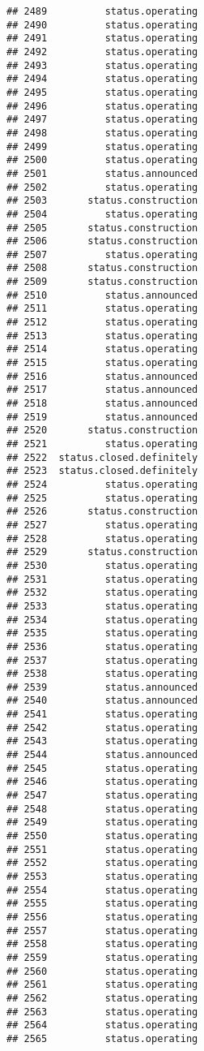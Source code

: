 \documentclass[
]{article}
\begin{document}
\begin{verbatim}
## 2489          status.operating
## 2490          status.operating
## 2491          status.operating
## 2492          status.operating
## 2493          status.operating
## 2494          status.operating
## 2495          status.operating
## 2496          status.operating
## 2497          status.operating
## 2498          status.operating
## 2499          status.operating
## 2500          status.operating
## 2501          status.announced
## 2502          status.operating
## 2503       status.construction
## 2504          status.operating
## 2505       status.construction
## 2506       status.construction
## 2507          status.operating
## 2508       status.construction
## 2509       status.construction
## 2510          status.announced
## 2511          status.operating
## 2512          status.operating
## 2513          status.operating
## 2514          status.operating
## 2515          status.operating
## 2516          status.announced
## 2517          status.announced
## 2518          status.announced
## 2519          status.announced
## 2520       status.construction
## 2521          status.operating
## 2522  status.closed.definitely
## 2523  status.closed.definitely
## 2524          status.operating
## 2525          status.operating
## 2526       status.construction
## 2527          status.operating
## 2528          status.operating
## 2529       status.construction
## 2530          status.operating
## 2531          status.operating
## 2532          status.operating
## 2533          status.operating
## 2534          status.operating
## 2535          status.operating
## 2536          status.operating
## 2537          status.operating
## 2538          status.operating
## 2539          status.announced
## 2540          status.announced
## 2541          status.operating
## 2542          status.operating
## 2543          status.operating
## 2544          status.announced
## 2545          status.operating
## 2546          status.operating
## 2547          status.operating
## 2548          status.operating
## 2549          status.operating
## 2550          status.operating
## 2551          status.operating
## 2552          status.operating
## 2553          status.operating
## 2554          status.operating
## 2555          status.operating
## 2556          status.operating
## 2557          status.operating
## 2558          status.operating
## 2559          status.operating
## 2560          status.operating
## 2561          status.operating
## 2562          status.operating
## 2563          status.operating
## 2564          status.operating
## 2565          status.operating

\end{verbatim}
\end{document}
